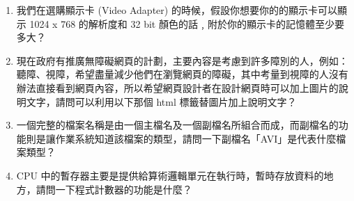 \documentclass[12pt,a4paper]{report}
\begin{document}
\begin{CJK}{UTF8}{bkai}
\begin{enumerate}
\item 我們在選購顯示卡 (Video Adapter) 的時候，假設你想要你的的顯示卡可以顯示 1024 x 768 的解析度和 32 bit 顏色的話﹐附於你的顯示卡的記憶體至少要多大？
\item 現在政府有推廣無障礙網頁的計劃，主要內容是考慮到許多障別的人，例如：聽障、視障，希望盡量減少他們在瀏覽網頁的障礙，其中考量到視障的人沒有辦法直接看到網頁內容，所以希望網頁設計者在設計網頁時可以加上圖片的說明文字，請問可以利用以下那個 html 標籤替圖片加上說明文字？
\item 一個完整的檔案名稱是由一個主檔名及一個副檔名所組合而成，而副檔名的功能則是讓作業系統知道該檔案的類型，請問一下副檔名「AVI」是代表什麼檔案類型？
\item CPU 中的暫存器主要是提供給算術邏輯單元在執行時，暫時存放資料的地方，請問一下程式計數器的功能是什麼？
\end{enumerate}
\end{CJK}
\end{document}
